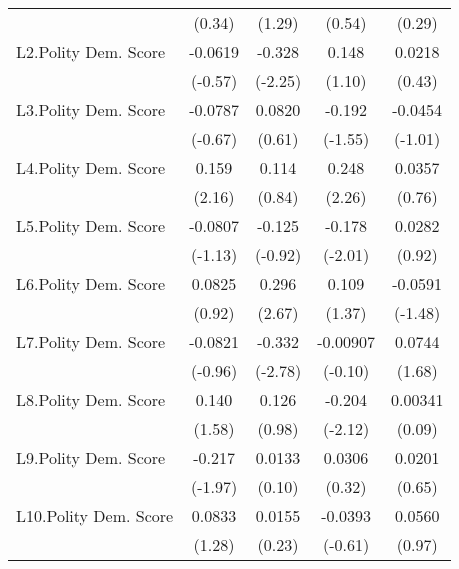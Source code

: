 {\begin{longtable}{l*{4}{c}}
                &   (0.34)         &   (1.29)         &   (0.54)         &   (0.29)         \\
[1em]
L2.Polity Dem. Score&  -0.0619         &   -0.328\sym{*}  &    0.148         &   0.0218         \\
                &  (-0.57)         &  (-2.25)         &   (1.10)         &   (0.43)         \\
[1em]
L3.Polity Dem. Score&  -0.0787         &   0.0820         &   -0.192         &  -0.0454         \\
                &  (-0.67)         &   (0.61)         &  (-1.55)         &  (-1.01)         \\
[1em]
L4.Polity Dem. Score&    0.159\sym{*}  &    0.114         &    0.248\sym{*}  &   0.0357         \\
                &   (2.16)         &   (0.84)         &   (2.26)         &   (0.76)         \\
[1em]
L5.Polity Dem. Score&  -0.0807         &   -0.125         &   -0.178\sym{*}  &   0.0282         \\
                &  (-1.13)         &  (-0.92)         &  (-2.01)         &   (0.92)         \\
[1em]
L6.Polity Dem. Score&   0.0825         &    0.296\sym{**} &    0.109         &  -0.0591         \\
                &   (0.92)         &   (2.67)         &   (1.37)         &  (-1.48)         \\
[1em]
L7.Polity Dem. Score&  -0.0821         &   -0.332\sym{**} & -0.00907         &   0.0744         \\
                &  (-0.96)         &  (-2.78)         &  (-0.10)         &   (1.68)         \\
[1em]
L8.Polity Dem. Score&    0.140         &    0.126         &   -0.204\sym{*}  &  0.00341         \\
                &   (1.58)         &   (0.98)         &  (-2.12)         &   (0.09)         \\
[1em]
L9.Polity Dem. Score&   -0.217\sym{*}  &   0.0133         &   0.0306         &   0.0201         \\
                &  (-1.97)         &   (0.10)         &   (0.32)         &   (0.65)         \\
[1em]
L10.Polity Dem. Score&   0.0833         &   0.0155         &  -0.0393         &   0.0560         \\
                &   (1.28)         &   (0.23)         &  (-0.61)         &   (0.97)         \\

\end{longtable}}
